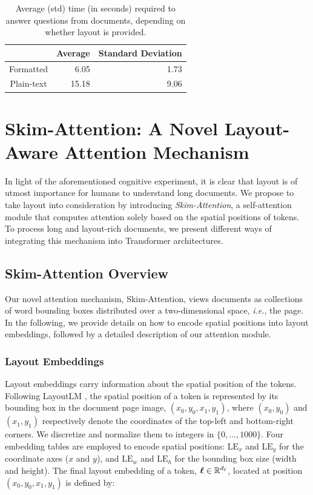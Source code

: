 \begin{table}
\centering \small
    \begin{tabular}{crr}
        \hline
                   & \textbf{Average} & \textbf{Standard Deviation} \\
        \hline 
        Formatted  & 6.05  & 1.73 \\
        Plain-text & 15.18 & 9.06 \\
        \hline
    \end{tabular}
\caption{Average (std) time (in seconds) required to answer questions from documents, depending on whether layout is provided.}
\label{tab:human-eval}
\end{table}

\section{Skim-Attention: A Novel Layout-Aware Attention Mechanism}

In light of the aforementioned cognitive experiment, it is clear that layout is of utmost importance for humans to understand long documents. We propose to take layout into consideration by introducing \emph{Skim-Attention}, a self-attention module that computes attention solely based on the spatial positions of tokens. To process long and layout-rich documents, we present different ways of integrating this mechanism into Transformer architectures.

\subsection{Skim-Attention Overview}

Our novel attention mechanism, Skim-Attention, views documents as collections of word bounding boxes distributed over a two-dimensional space, \textit{i.e.}, the page. In the following, we provide details on how to encode spatial positions into layout embeddings, followed by a detailed description of our attention module.

\subsubsection{Layout Embeddings}

Layout embeddings carry information about the spatial position of the tokens. Following LayoutLM \citep{xu2020layoutlm}, the spatial position of a token is represented by its bounding box in the document page image, $(x_0, y_0, x_1, y_1)$, where $(x_0, y_0)$ and $(x_1, y_1)$ respectively denote the coordinates of the top-left and bottom-right corners. We discretize and normalize them to integers in $\{0, ..., 1000\}$. Four embedding tables are employed to encode spatial positions: $\text{LE}_x$ and $\text{LE}_y$ for the coordinate axes ($x$ and $y$), and $\text{LE}_w$ and $\text{LE}_h$ for the bounding box size (width and height). The final layout embedding of a token, $\boldsymbol{\ell} \in \mathbb{R}^{d_{\ell}}$, located at position $(x_0, y_0, x_1, y_1)$ is defined by:
\vspace{-0.5cm}

